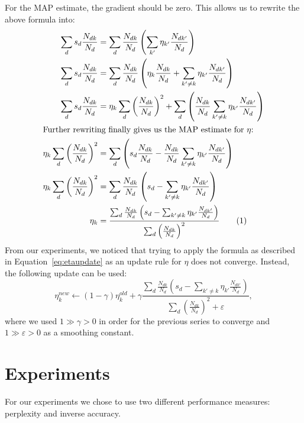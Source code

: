 \documentclass{article} %
\renewcommand{\epsilon}{\varepsilon}
\newcommand{\numberthis}{\addtocounter{equation}{1}\tag{\theequation}}
\begin{document}
For the MAP estimate, the gradient should be zero.
This allows us to rewrite the above formula into:
\begin{align*}
\sum_d s_d \frac{N_{dk}}{N_d} &= \sum_d \frac{N_{dk}}{N_d} \left( \sum_{k'} \eta_{k'} \frac{N_{dk'}}{N_d} \right)\\
\sum_d s_d \frac{N_{dk}}{N_d} &= \sum_d \frac{N_{dk}}{N_d} \left( \eta_k \frac{N_{dk}}{N_d} + \sum_{k' \ne k} \eta_{k'} \frac{N_{dk'}}{N_d} \right) \\
\sum_d s_d \frac{N_{dk}}{N_d} &= \eta_k \sum_d \left( \frac{N_{dk}}{N_d}  \right)^2 + \sum_d \left( \frac{N_{dk}}{N_d} \sum_{k' \ne k} \eta_{k'} \frac{N_{dk'}}{N_d} \right) \\
\intertext{Further rewriting finally gives us the MAP estimate for \(\eta\):}
\eta_k \sum_d \left( \frac{N_{dk}}{N_d}  \right)^2  &=\sum_d \left( s_d \frac{N_{dk}}{N_d} - \frac{N_{dk}}{N_d} \sum_{k' \ne k} \eta_{k'} \frac{N_{dk'}}{N_d} \right)\\
\eta_k \sum_d \left( \frac{N_{dk}}{N_d}  \right)^2 &=  \sum_d \frac{N_{dk}}{N_d} \left( s_d - \sum_{k' \ne k} \eta_{k'} \frac{N_{dk'}}{N_d} \right)\\
\eta_k &= \frac{\sum_d \frac{N_{dk}}{N_d} \left( s_d - \sum_{k' \ne k} \eta_{k'} \frac{N_{dk'}}{N_d} \right)}{\sum_d \left( \frac{N_{dk}}{N_d}  \right)^2} \numberthis \label{eq:etaupdate}
\end{align*}
From our experiments, we noticed that trying to apply the formula as described in Equation~\ref{eq:etaupdate} as an update rule for \(\eta\) does not converge.
Instead, the following update can be used:
\begin{equation}
\eta_k^{new} \leftarrow (1 - \gamma) \eta_k^{old} + \gamma \frac{\sum_d \frac{N_{dk}}{N_d} \left( s_d - \sum_{k' \ne k} \eta_{k'} \frac{N_{dk'}}{N_d} \right)}{\sum_d \left( \frac{N_{dk}}{N_d}  \right)^2 + \epsilon},
\end{equation}
where we used $1 \gg \gamma > 0$ in order for the previous series to converge and $1 \gg \epsilon > 0$ as a smoothing constant.

\section{Experiments}
\label{sec:experiments}

For our experiments we chose to use two different performance measures: perplexity and inverse accuracy.
\end{document}
